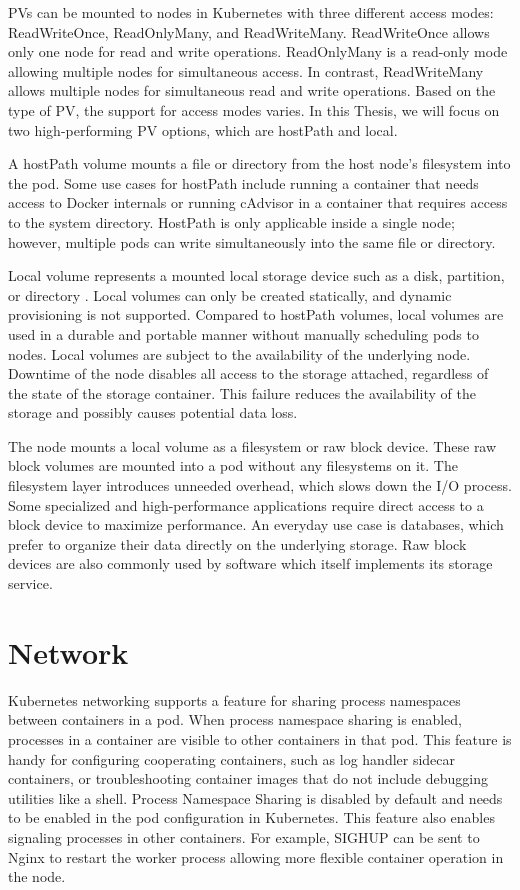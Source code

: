 PVs can be mounted to nodes in Kubernetes with three different access modes: ReadWriteOnce, ReadOnlyMany, and ReadWriteMany. ReadWriteOnce allows only one node for read and write operations. ReadOnlyMany is a read-only mode allowing multiple nodes for simultaneous access. In contrast, ReadWriteMany allows multiple nodes for simultaneous read and write operations. Based on the type of PV, the support for access modes varies. In this Thesis, we will focus on two high-performing PV options, which are hostPath and local. \cite{PV} 

A hostPath volume mounts a file or directory from the host node's filesystem into the pod. Some use cases for hostPath include running a container that needs access to Docker internals or running cAdvisor in a container that requires access to the system directory. HostPath is only applicable inside a single node; however, multiple pods can write simultaneously into the same file or directory.

Local volume represents a mounted local storage device such as a disk, partition, or directory \cite{VolumesKubernetes}. Local volumes can only be created statically, and dynamic provisioning is not supported. Compared to hostPath volumes, local volumes are used in a durable and portable manner without manually scheduling pods to nodes. Local volumes are subject to the availability of the underlying node. Downtime of the node disables all access to the storage attached, regardless of the state of the storage container. This failure reduces the availability of the storage and possibly causes potential data loss.

The node mounts a local volume as a filesystem or raw block device. These raw block volumes are mounted into a pod without any filesystems on it. The filesystem layer introduces unneeded overhead, which slows down the I/O process. Some specialized and high-performance applications require direct access to a block device to maximize performance. An everyday use case is databases, which prefer to organize their data directly on the underlying storage. Raw block devices are also commonly used by software which itself implements its storage service. \cite{RawBlockKubernetes}

\section{Network}

Kubernetes networking supports a feature for sharing process namespaces between containers in a pod. When process namespace sharing is enabled, processes in a container are visible to other containers in that pod. This feature is handy for configuring cooperating containers, such as log handler sidecar containers, or troubleshooting container images that do not include debugging utilities like a shell. Process Namespace Sharing is disabled by default and needs to be enabled in the pod configuration in Kubernetes. This feature also enables signaling processes in other containers. For example, SIGHUP can be sent to Nginx to restart the worker process allowing more flexible container operation in the node. \cite{ShareProcessNamespaceKubernetes}

